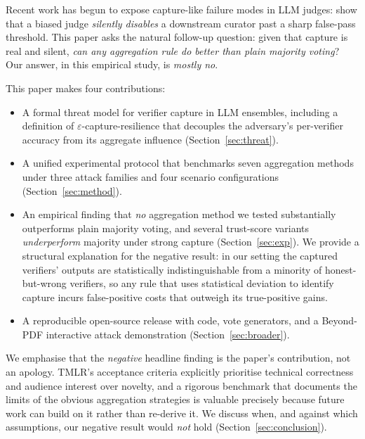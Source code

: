 \documentclass[11pt]{article}
\begin{document}
Recent work has begun to expose capture-like failure modes in LLM judges:
\citet{zhang2026blindcurator} show that a biased judge \emph{silently
disables} a downstream curator past a sharp false-pass threshold. This paper
asks the natural follow-up question: given that capture is real and silent,
\emph{can any aggregation rule do better than plain majority voting}? Our
answer, in this empirical study, is \emph{mostly no}.

This paper makes four contributions:

\begin{itemize}
  \item A formal threat model for verifier capture in LLM ensembles, including
        a definition of $\varepsilon$-capture-resilience that decouples the
        adversary's per-verifier accuracy from its aggregate influence
        (Section~\ref{sec:threat}).
  \item A unified experimental protocol that benchmarks seven aggregation
        methods under three attack families and four scenario configurations
        (Section~\ref{sec:method}).
  \item An empirical finding that \emph{no} aggregation method we tested
        substantially outperforms plain majority voting, and several
        trust-score variants \emph{underperform} majority under strong
        capture (Section~\ref{sec:exp}). We provide a structural
        explanation for the negative result: in our setting the captured
        verifiers' outputs are statistically indistinguishable from a
        minority of honest-but-wrong verifiers, so any rule that uses
        statistical deviation to identify capture incurs false-positive
        costs that outweigh its true-positive gains.
  \item A reproducible open-source release with code, vote generators, and a
        Beyond-PDF interactive attack demonstration
        (Section~\ref{sec:broader}).
\end{itemize}

We emphasise that the \emph{negative} headline finding is the paper's
contribution, not an apology. TMLR's acceptance criteria explicitly
prioritise technical correctness and audience interest over novelty, and a
rigorous benchmark that documents the limits of the obvious aggregation
strategies is valuable precisely because future work can build on it
rather than re-derive it. We discuss when, and against which assumptions,
our negative result would \emph{not} hold
(Section~\ref{sec:conclusion}).
\end{document}
